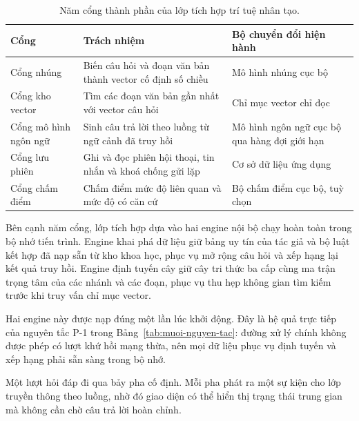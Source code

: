 \begin{table}[htbp]
    \centering
    \caption{Năm cổng thành phần của lớp tích hợp trí tuệ nhân tạo.}
    \label{tab:nam-cong-ai}
    \small
    \begin{tabularx}{\textwidth}{@{}>{\raggedright\arraybackslash}p{3.2cm}>{\raggedright\arraybackslash}X>{\raggedright\arraybackslash}p{4.4cm}@{}}
        \toprule
        \textbf{Cổng} & \textbf{Trách nhiệm} & \textbf{Bộ chuyển đổi hiện hành} \\
        \midrule
        Cổng nhúng & Biến câu hỏi và đoạn văn bản thành vector cố định số chiều & Mô hình nhúng cục bộ \\
        Cổng kho vector & Tìm các đoạn văn bản gần nhất với vector câu hỏi & Chỉ mục vector chỉ đọc \\
        Cổng mô hình ngôn ngữ & Sinh câu trả lời theo luồng từ ngữ cảnh đã truy hồi & Mô hình ngôn ngữ cục bộ qua hàng đợi giới hạn \\
        Cổng lưu phiên & Ghi và đọc phiên hội thoại, tin nhắn và khoá chống gửi lặp & Cơ sở dữ liệu ứng dụng \\
        Cổng chấm điểm & Chấm điểm mức độ liên quan và mức độ có căn cứ & Bộ chấm điểm cục bộ, tuỳ chọn \\
        \bottomrule
    \end{tabularx}
\end{table}

Bên cạnh năm cổng, lớp tích hợp dựa vào hai engine nội bộ chạy hoàn toàn trong bộ nhớ tiến trình. Engine khai phá dữ liệu giữ bảng uy tín của tác giả và bộ luật kết hợp đã nạp sẵn từ kho khoa học, phục vụ mở rộng câu hỏi và xếp hạng lại kết quả truy hồi. Engine định tuyến cây giữ cây tri thức ba cấp cùng ma trận trọng tâm của các nhánh và các đoạn, phục vụ thu hẹp không gian tìm kiếm trước khi truy vấn chỉ mục vector.

Hai engine này được nạp đúng một lần lúc khởi động. Đây là hệ quả trực tiếp của nguyên tắc P-1 trong Bảng~\ref{tab:muoi-nguyen-tac}: đường xử lý chính không được phép có lượt khứ hồi mạng thừa, nên mọi dữ liệu phục vụ định tuyến và xếp hạng phải sẵn sàng trong bộ nhớ.

Một lượt hỏi đáp đi qua bảy pha cố định. Mỗi pha phát ra một sự kiện cho lớp truyền thông theo luồng, nhờ đó giao diện có thể hiển thị trạng thái trung gian mà không cần chờ câu trả lời hoàn chỉnh.

